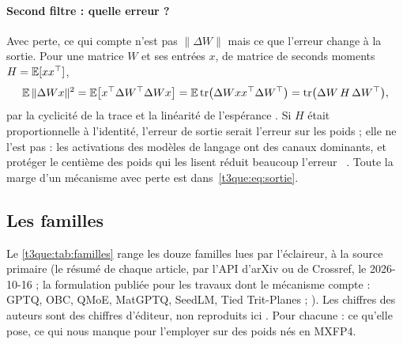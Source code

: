 \paragraph{Second filtre : quelle erreur ?} Avec perte, ce qui compte n'est pas $\|\Delta W\|$ mais ce que l'erreur change à la sortie. Pour une matrice $W$ et ses entrées $x$, de matrice de seconds moments $H = \mathbb{E}[x x^\top]$,
\begin{equation}\label{t3que:eq:sortie}
\mathbb{E}\,\|\Delta W x\|^2 = \mathbb{E}\bigl[x^\top \Delta W^\top \Delta W x\bigr] = \mathbb{E}\,\mathrm{tr}\bigl(\Delta W x x^\top \Delta W^\top\bigr) = \mathrm{tr}\bigl(\Delta W\, H\, \Delta W^\top\bigr),
\end{equation}
par la cyclicité de la trace et la linéarité de l'espérance \calc. Si $H$ était proportionnelle à l'identité, l'erreur de sortie serait l'erreur sur les poids ; elle ne l'est pas : les activations des modèles de langage ont des canaux dominants, et protéger le centième des poids qui les lisent réduit beaucoup l'erreur~\cite{lin2023awq} \litt. Toute la marge d'un mécanisme avec perte est dans~\eqref{t3que:eq:sortie}.

\subsection{Les familles}

Le \cref{t3que:tab:familles} range les douze familles lues par l'éclaireur, à la source primaire (le résumé de chaque article, par l'API d'arXiv ou de Crossref, le 2026-10-16 ; la formulation publiée pour les travaux dont le mécanisme compte : GPTQ, OBC, QMoE, MatGPTQ, SeedLM, Tied Trit-Planes ; ). Les chiffres des auteurs sont des chiffres d'éditeur, non reproduits ici \litt. Pour chacune : ce qu'elle pose, ce qui nous manque pour l'employer sur des poids nés en MXFP4.

